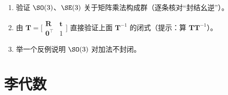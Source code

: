 \begin{practice}
\begin{enumerate}
  \item 验证 $\SO(3)$、$\SE(3)$ 关于矩阵乘法构成群（逐条核对“封结幺逆”）。
  \item 由 $\mathbf{T}=\big[\begin{smallmatrix}\mathbf{R}&\mathbf{t}\\\mathbf{0}^\top&1\end{smallmatrix}\big]$ 直接验证上面 $\mathbf{T}^{-1}$ 的闭式（提示：算 $\mathbf{T}\mathbf{T}^{-1}$）。
  \item 举一个反例说明 $\SO(3)$ 对加法不封闭。
\end{enumerate}
\end{practice}

\section{李代数}
\label{sec:lie-algebra}

